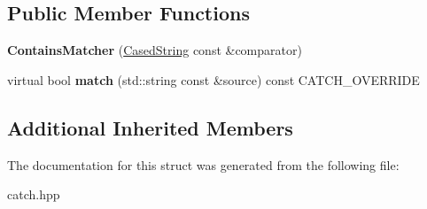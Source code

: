 \subsection*{Public Member Functions}
\begin{DoxyCompactItemize}
\item 
\mbox{\label{structCatch_1_1Matchers_1_1StdString_1_1ContainsMatcher_acc892883c8409e34b28c9b39d4ef1fe3}} 
{\bfseries Contains\+Matcher} (\hyperlink{structCatch_1_1Matchers_1_1StdString_1_1CasedString}{Cased\+String} const \&comparator)
\item 
\mbox{\label{structCatch_1_1Matchers_1_1StdString_1_1ContainsMatcher_ae4d567347fa563e365f1044f29ab1042}} 
virtual bool {\bfseries match} (std\+::string const \&source) const C\+A\+T\+C\+H\+\_\+\+O\+V\+E\+R\+R\+I\+DE
\end{DoxyCompactItemize}
\subsection*{Additional Inherited Members}


The documentation for this struct was generated from the following file\+:\begin{DoxyCompactItemize}
\item 
catch.\+hpp\end{DoxyCompactItemize}
